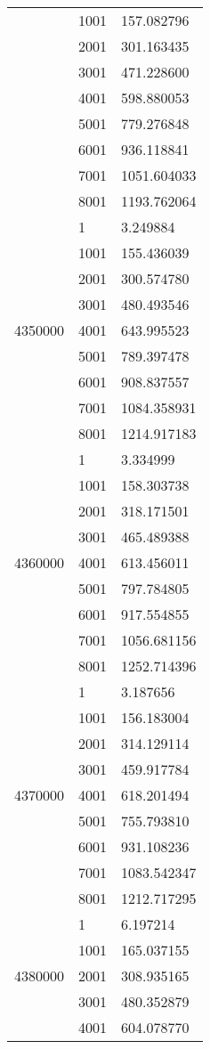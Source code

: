 \begin{table}[htb!]
\begin{tabular}{lll}
 & 1001 & 157.082796 \\
 & 2001 & 301.163435 \\
 & 3001 & 471.228600 \\
 & 4001 & 598.880053 \\
 & 5001 & 779.276848 \\
 & 6001 & 936.118841 \\
 & 7001 & 1051.604033 \\
 & 8001 & 1193.762064 \\
\multirow[c]{9}{*}{4350000} & 1 & 3.249884 \\
 & 1001 & 155.436039 \\
 & 2001 & 300.574780 \\
 & 3001 & 480.493546 \\
 & 4001 & 643.995523 \\
 & 5001 & 789.397478 \\
 & 6001 & 908.837557 \\
 & 7001 & 1084.358931 \\
 & 8001 & 1214.917183 \\
\multirow[c]{9}{*}{4360000} & 1 & 3.334999 \\
 & 1001 & 158.303738 \\
 & 2001 & 318.171501 \\
 & 3001 & 465.489388 \\
 & 4001 & 613.456011 \\
 & 5001 & 797.784805 \\
 & 6001 & 917.554855 \\
 & 7001 & 1056.681156 \\
 & 8001 & 1252.714396 \\
\multirow[c]{9}{*}{4370000} & 1 & 3.187656 \\
 & 1001 & 156.183004 \\
 & 2001 & 314.129114 \\
 & 3001 & 459.917784 \\
 & 4001 & 618.201494 \\
 & 5001 & 755.793810 \\
 & 6001 & 931.108236 \\
 & 7001 & 1083.542347 \\
 & 8001 & 1212.717295 \\
\multirow[c]{9}{*}{4380000} & 1 & 6.197214 \\
 & 1001 & 165.037155 \\
 & 2001 & 308.935165 \\
 & 3001 & 480.352879 \\
 & 4001 & 604.078770 \\

\end{tabular}
\end{table}
